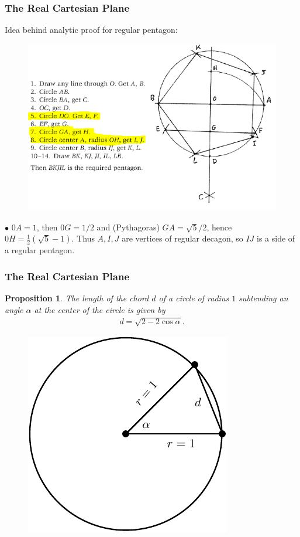 \documentclass[compress,mathserif,serif]{beamer}
\newtheorem{prop}{Proposition}
\begin{document}
\begin{frame}
\frametitle{The Real Cartesian Plane}
Idea behind analytic proof for regular pentagon:
\pause
\begin{figure}[hbtp]
\centering
\includegraphics[scale=.5]{idea.png}
\end{figure}
\pause
$\bullet$ $0A=1$, then $0G=1/2$ and (Pythagoras) $GA= \sqrt{5}/2$, hence $0H= \frac{1}{2}( \sqrt{5}-1)$. Thus $A,I,J$ are vertices of regular decagon, so $IJ$ is a side of a regular pentagon.
\end{frame}



\begin{frame}
\frametitle{The Real Cartesian Plane}
\begin{prop}The length of the chord $d$ of a circle of radius $1$ subtending an angle $\alpha$ at the center of the circle is given by \begin{align*}
d= \sqrt{2-  2 \cos \alpha}.
\end{align*}
\begin{figure}[hbtp]
\centering
\includegraphics[scale=.8]{lawcosine.pdf}
\end{figure}
\end{prop}
\end{frame}
\end{document}

